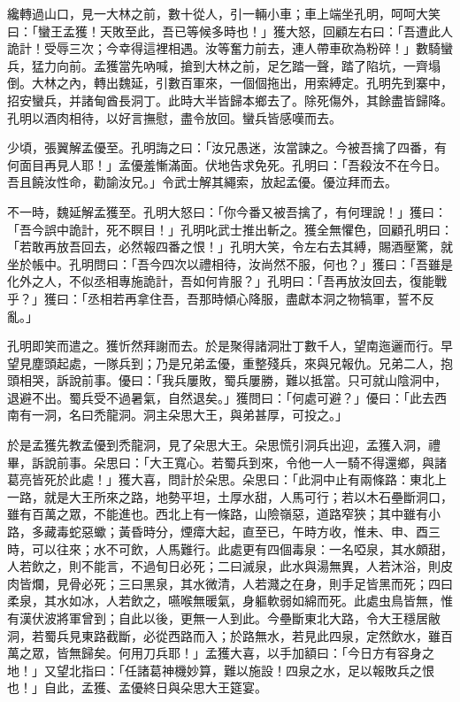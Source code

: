纔轉過山口，見一大林之前，數十從人，引一輛小車；車上端坐孔明，呵呵大笑曰：「蠻王孟獲！天敗至此，吾已等候多時也！」獲大怒，回顧左右曰：「吾遭此人詭計！受辱三次；今幸得這裡相遇。汝等奮力前去，連人帶車砍為粉碎！」數騎蠻兵，猛力向前。孟獲當先吶喊，搶到大林之前，足乞踏一聲，踏了陷坑，一齊塌倒。大林之內，轉出魏延，引數百軍來，一個個拖出，用索縛定。孔明先到寨中，招安蠻兵，并諸甸酋長洞丁。此時大半皆歸本鄉去了。除死傷外，其餘盡皆歸降。孔明以酒肉相待，以好言撫慰，盡令放回。蠻兵皆感嘆而去。

少頃，張翼解孟優至。孔明誨之曰：「汝兄愚迷，汝當諫之。今被吾擒了四番，有何面目再見人耶！」孟優羞慚滿面。伏地告求免死。孔明曰：「吾殺汝不在今日。吾且饒汝性命，勸諭汝兄。」令武士解其繩索，放起孟優。優泣拜而去。

不一時，魏延解孟獲至。孔明大怒曰：「你今番又被吾擒了，有何理說！」獲曰：「吾今誤中詭計，死不瞑目！」孔明叱武士推出斬之。獲全無懼色，回顧孔明曰：「若敢再放吾回去，必然報四番之恨！」孔明大笑，令左右去其縛，賜酒壓驚，就坐於帳中。孔明問曰：「吾今四次以禮相待，汝尚然不服，何也？」獲曰：「吾雖是化外之人，不似丞相專施詭計，吾如何肯服？」孔明曰：「吾再放汝回去，復能戰乎？」獲曰：「丞相若再拿住吾，吾那時傾心降服，盡獻本洞之物犒軍，誓不反亂。」

孔明即笑而遣之。獲忻然拜謝而去。於是聚得諸洞壯丁數千人，望南迤邐而行。早望見塵頭起處，一隊兵到；乃是兄弟孟優，重整殘兵，來與兄報仇。兄弟二人，抱頭相哭，訴說前事。優曰：「我兵屢敗，蜀兵屢勝，難以抵當。只可就山陰洞中，退避不出。蜀兵受不過暑氣，自然退矣。」獲問曰：「何處可避？」優曰：「此去西南有一洞，名曰禿龍洞。洞主朵思大王，與弟甚厚，可投之。」

於是孟獲先教孟優到禿龍洞，見了朵思大王。朵思慌引洞兵出迎，孟獲入洞，禮畢，訴說前事。朵思曰：「大王寬心。若蜀兵到來，令他一人一騎不得還鄉，與諸葛亮皆死於此處！」獲大喜，問計於朵思。朵思曰：「此洞中止有兩條路：東北上一路，就是大王所來之路，地勢平坦，土厚水甜，人馬可行；若以木石壘斷洞口，雖有百萬之眾，不能進也。西北上有一條路，山險嶺惡，道路窄狹；其中雖有小路，多藏毒蛇惡蠍；黃昏時分，煙瘴大起，直至已，午時方收，惟未、申、酉三時，可以往來；水不可飲，人馬難行。此處更有四個毒泉：一名啞泉，其水頗甜，人若飲之，則不能言，不過旬日必死；二曰滅泉，此水與湯無異，人若沐浴，則皮肉皆爛，見骨必死；三曰黑泉，其水微清，人若濺之在身，則手足皆黑而死；四曰柔泉，其水如冰，人若飲之，嚥喉無暖氣，身軀軟弱如綿而死。此處虫鳥皆無，惟有漢伏波將軍曾到；自此以後，更無一人到此。今壘斷東北大路，令大王穩居敝洞，若蜀兵見東路截斷，必從西路而入；於路無水，若見此四泉，定然飲水，雖百萬之眾，皆無歸矣。何用刀兵耶！」孟獲大喜，以手加額曰：「今日方有容身之地！」又望北指曰：「任諸葛神機妙算，難以施設！四泉之水，足以報敗兵之恨也！」自此，孟獲、孟優終日與朵思大王筵宴。

